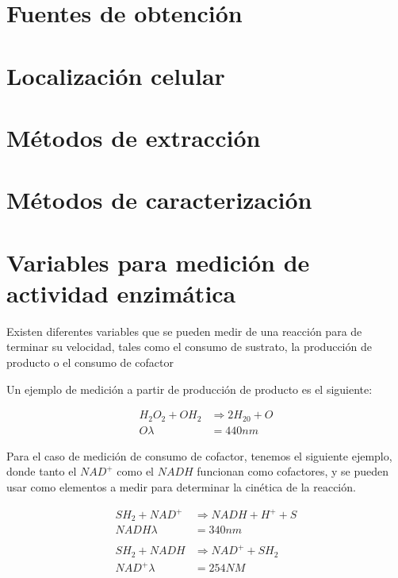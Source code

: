 


\section{Fuentes de obtención}



\section{Localización celular}



\section{Métodos de extracción}



\section{Métodos de caracterización}



\section{Variables para medición de actividad enzimática}

Existen diferentes variables que se pueden medir de una reacción para de terminar su velocidad, tales como el consumo de sustrato, la producción de producto o el consumo de cofactor

Un ejemplo de medición a partir de producción de producto es el siguiente:

\begin{align*}
    H_2O_2 + OH_2 &\Longrightarrow 2H_20 + O
    \\
    O \lambda &= 440nm
\end{align*}

Para el caso de medición de consumo de cofactor, tenemos el siguiente ejemplo, donde tanto el $NAD^+$ como el $NADH$ funcionan como cofactores, y se pueden usar como elementos a medir para determinar la cinética de la reacción.

\begin{align*}
    SH_2 + NAD^{+} &\Longrightarrow NADH + H^{+} + S
    \\
    NADH \lambda &= 340nm
    \\
    \\
    SH_2 + NADH &\Longrightarrow NAD^{+} + SH_2
    \\
    NAD^{+} \lambda &= 254NM
\end{align*}

